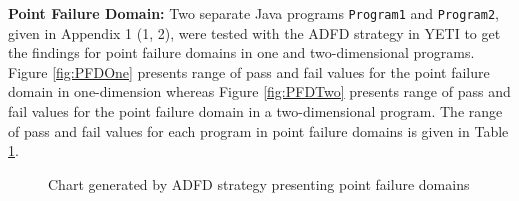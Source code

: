 \begin{table}[h]
{\begin{tabular}{|c|c|c|l|l|l|}
				
\end{tabular}
}
\label{table:failtable}
\end{table}

\bigskip

\textbf{Point Failure Domain:}  Two separate Java programs \verb+Program1+ and \verb+Program2+, given in Appendix 1 (1, 2), were tested with the ADFD strategy in YETI to get the findings for point failure domains in one and two-dimensional programs. Figure \ref{fig:PFDOne} presents range of pass and fail values for the point failure domain in one-dimension whereas Figure \ref{fig:PFDTwo} presents range of pass and fail values for the point failure domain in a two-dimensional program. The range of pass and fail values for each program in point failure domains is given in Table \ref{table:failtable}.

\begin{figure} [H]
\centering
{}

\bigskip
{}
\bigskip
\caption{Chart generated by ADFD strategy presenting point failure domains}
\end{figure}
\bigskip

